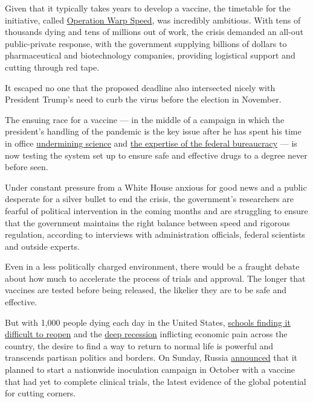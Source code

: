 Given that it typically takes years to develop a vaccine, the timetable
for the initiative, called
\href{https://www.nytimes.com/2020/04/29/us/politics/trump-coronavirus-vaccine-operation-warp-speed.html}{Operation
Warp Speed}, was incredibly ambitious. With tens of thousands dying and
tens of millions out of work, the crisis demanded an all-out
public-private response, with the government supplying billions of
dollars to pharmaceutical and biotechnology companies, providing
logistical support and cutting through red tape.

It escaped no one that the proposed deadline also intersected nicely
with President Trump's need to curb the virus before the election in
November.

The ensuing race for a vaccine --- in the middle of a campaign in which
the president's handling of the pandemic is the key issue after he has
spent his time in office
\href{https://www.nytimes.com/2020/04/28/climate/trump-coronavirus-climate-science.html}{undermining
science} and
\href{https://www.nytimes.com/2020/07/09/climate/trump-hurricane-dorian-noaa.html}{the
expertise of the federal bureaucracy} --- is now testing the system set
up to ensure safe and effective drugs to a degree never before seen.

Under constant pressure from a White House anxious for good news and a
public desperate for a silver bullet to end the crisis, the government's
researchers are fearful of political intervention in the coming months
and are struggling to ensure that the government maintains the right
balance between speed and rigorous regulation, according to interviews
with administration officials, federal scientists and outside experts.

Even in a less politically charged environment, there would be a fraught
debate about how much to accelerate the process of trials and approval.
The longer that vaccines are tested before being released, the likelier
they are to be safe and effective.

But with 1,000 people dying each day in the United States,
\href{https://www.nytimes.com/interactive/2020/07/31/us/coronavirus-school-reopening-risk.html}{schools
finding it difficult to reopen} and the
\href{https://www.nytimes.com/2020/07/30/business/economy/q2-gdp-coronavirus-economy.html}{deep
recession} inflicting economic pain across the country, the desire to
find a way to return to normal life is powerful and transcends partisan
politics and borders. On Sunday, Russia
\href{https://www.nytimes.com/2020/08/02/world/europe/russia-trials-vaccine-October.html}{announced}
that it planned to start a nationwide inoculation campaign in October
with a vaccine that had yet to complete clinical trials, the latest
evidence of the global potential for cutting corners.


